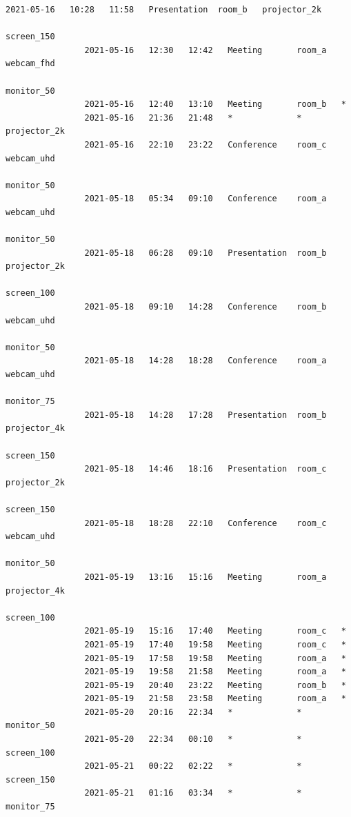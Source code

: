 \documentclass{article}
\begin{document}
\begin{Verbatim}[gobble=8]
                2021-05-16   10:28   11:58   Presentation  room_b   projector_2k
                                                                    screen_150
                2021-05-16   12:30   12:42   Meeting       room_a   webcam_fhd
                                                                    monitor_50
                2021-05-16   12:40   13:10   Meeting       room_b   *
                2021-05-16   21:36   21:48   *             *        projector_2k
                2021-05-16   22:10   23:22   Conference    room_c   webcam_uhd
                                                                    monitor_50
                2021-05-18   05:34   09:10   Conference    room_a   webcam_uhd
                                                                    monitor_50
                2021-05-18   06:28   09:10   Presentation  room_b   projector_2k
                                                                    screen_100
                2021-05-18   09:10   14:28   Conference    room_b   webcam_uhd
                                                                    monitor_50
                2021-05-18   14:28   18:28   Conference    room_a   webcam_uhd
                                                                    monitor_75
                2021-05-18   14:28   17:28   Presentation  room_b   projector_4k
                                                                    screen_150
                2021-05-18   14:46   18:16   Presentation  room_c   projector_2k
                                                                    screen_150
                2021-05-18   18:28   22:10   Conference    room_c   webcam_uhd
                                                                    monitor_50
                2021-05-19   13:16   15:16   Meeting       room_a   projector_4k
                                                                    screen_100
                2021-05-19   15:16   17:40   Meeting       room_c   *
                2021-05-19   17:40   19:58   Meeting       room_c   *
                2021-05-19   17:58   19:58   Meeting       room_a   *
                2021-05-19   19:58   21:58   Meeting       room_a   *
                2021-05-19   20:40   23:22   Meeting       room_b   *
                2021-05-19   21:58   23:58   Meeting       room_a   *
                2021-05-20   20:16   22:34   *             *        monitor_50
                2021-05-20   22:34   00:10   *             *        screen_100
                2021-05-21   00:22   02:22   *             *        screen_150
                2021-05-21   01:16   03:34   *             *        monitor_75

\end{Verbatim}
\end{document}
